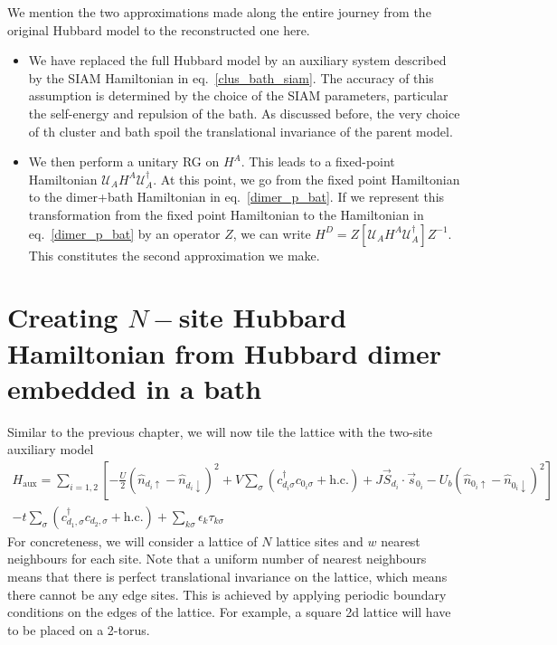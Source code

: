 \documentclass{report}
\numberwithin{equation}{section}
\begin{document}
{ We mention the two approximations made along the entire journey from the original Hubbard model to the reconstructed one here.
 \begin{itemize}
 	\item We have replaced the full Hubbard model by an auxiliary system described by the SIAM Hamiltonian in eq.~\ref{clus_bath_siam}. The accuracy of this assumption is determined by the choice of the SIAM parameters, particular the self-energy and repulsion of the bath. As discussed before, the very choice of th cluster and bath spoil the translational invariance of the parent model.
 	\item We then perform a unitary RG on $H^A$. This leads to a fixed-point Hamiltonian $\mathcal{U}_A H^A \mathcal{U}_A^\dagger$. At this point, we go from the fixed point Hamiltonian to the dimer+bath Hamiltonian in eq.~\ref{dimer_p_bat}. If we represent this transformation from the fixed point Hamiltonian to the Hamiltonian in eq.~\ref{dimer_p_bat} by an operator \(Z\), we can write $H^D = Z\left[\mathcal{U}_A H^A \mathcal{U}_A^\dagger \right] Z^{-1}$. This constitutes the second approximation we make.
\end{itemize}
}


\section{Creating \(N-\)site Hubbard Hamiltonian from Hubbard dimer embedded in a bath}
Similar to the previous chapter, we will now tile the lattice with the two-site auxiliary model
\begin{equation}\begin{aligned}
	H_\text{aux} = \sum_{i=1,2} \left[- \frac{U}{2}\left(\hat n_{d_i \uparrow} - \hat n_{d_i \downarrow}\right)^2 + V\sum_{\sigma}\left(c^\dagger_{d_i\sigma}c_{0_i\sigma} + \text{h.c.}\right) + J \vec{S}_{d_i}\cdot\vec{s}_{0_i} - U_b\left(\hat n_{0_i \uparrow} - \hat n_{0_i \downarrow}\right)^2\right]\\
	 -t \sum_\sigma \left(c^\dagger_{d_1,\sigma}c_{d_2,\sigma} + \text{h.c.}\right) + \sum_{k\sigma}\epsilon_k \tau_{k\sigma}
\end{aligned}\end{equation}
For concreteness, we will consider a lattice of \(N\) lattice sites and \(w\) nearest neighbours for each site. Note that a uniform number of nearest neighbours means that there is perfect translational invariance on the lattice, which means there cannot be any edge sites. This is achieved by applying periodic boundary conditions on the edges of the lattice. For example, a square 2d lattice will have to be placed on a 2-torus.
\end{document}
